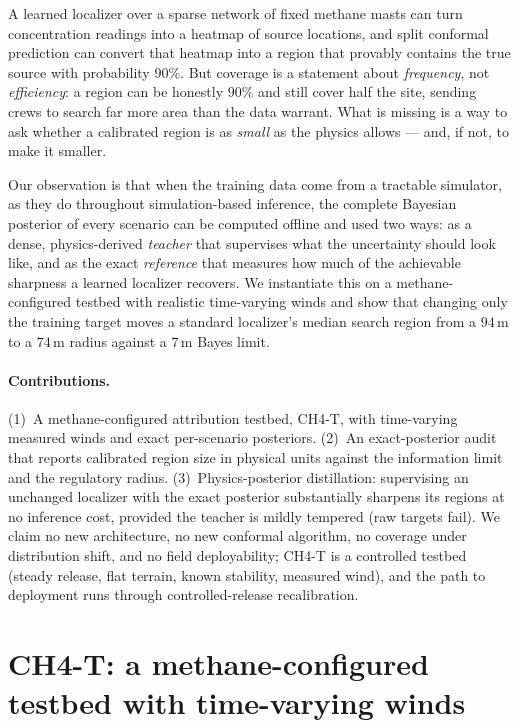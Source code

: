 \documentclass{article}
\begin{document}
A learned localizer over a sparse network of fixed methane masts can turn concentration
readings into a heatmap of source locations, and split conformal prediction can convert
that heatmap into a region that provably contains the true source with probability $90\%$.
But coverage is a statement about \emph{frequency}, not \emph{efficiency}: a region can be
honestly $90\%$ and still cover half the site, sending crews to search far more area than
the data warrant. What is missing is a way to ask whether a calibrated region is as
\emph{small} as the physics allows --- and, if not, to make it smaller.

Our observation is that when the training data come from a tractable simulator, as they do
throughout simulation-based inference, the complete Bayesian posterior of every scenario
can be computed offline and used two ways: as a dense, physics-derived \emph{teacher} that
supervises what the uncertainty should look like, and as the exact \emph{reference} that
measures how much of the achievable sharpness a learned localizer recovers. We instantiate
this on a methane-configured testbed with realistic time-varying winds and show that
changing only the training target moves a standard localizer's median search region from a
$94$\,m to a $74$\,m radius against a $7$\,m Bayes limit.

\paragraph{Contributions.} (1)~A methane-configured attribution testbed, CH4-T, with
time-varying measured winds and exact per-scenario posteriors. (2)~An exact-posterior
audit that reports calibrated region size in physical units against the information limit
and the regulatory radius. (3)~Physics-posterior distillation: supervising an unchanged
localizer with the exact posterior substantially sharpens its regions at no inference cost,
provided the teacher is mildly tempered (raw targets fail). We claim no new architecture,
no new conformal algorithm, no coverage under distribution shift, and no field
deployability; CH4-T is a controlled testbed (steady release, flat terrain, known
stability, measured wind), and the path to deployment runs through controlled-release
recalibration.

\section{CH4-T: a methane-configured testbed with time-varying winds}
\end{document}

